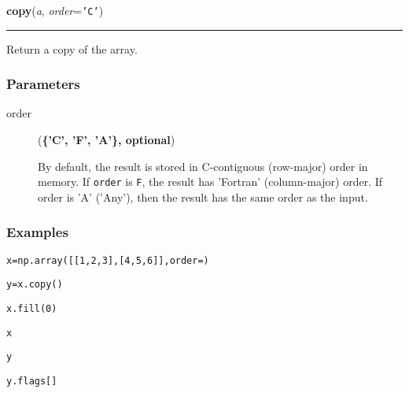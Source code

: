     \begin{boxedminipage}{\textwidth}

    \raggedright \textbf{copy}(\textit{a}, \textit{order}=\texttt{'C'})

    \vspace{-1.5ex}

    \rule{\textwidth}{0.5\fboxrule}

Return a copy of the array.



\hypertarget{parameters}{}
\subsubsection*{Parameters}
\begin{description}
\item[{order}] (\textbf{{\{}'C', 'F', 'A'{\}}, optional})

By default, the result is stored in C-contiguous (row-major) order in
memory.  If \texttt{order} is \texttt{F}, the result has 'Fortran' (column-major)
order.  If order is 'A' ('Any'), then the result has the same order
as the input.

\end{description}



\hypertarget{examples}{}
\subsubsection*{Examples}
\begin{alltt}
\pysrcprompt{{\textgreater}{\textgreater}{\textgreater} }x = np.array([[1,2,3],[4,5,6]], order=)\end{alltt}
\begin{alltt}
\pysrcprompt{{\textgreater}{\textgreater}{\textgreater} }y = x.copy()\end{alltt}
\begin{alltt}
\pysrcprompt{{\textgreater}{\textgreater}{\textgreater} }x.fill(0)\end{alltt}
\begin{alltt}
\pysrcprompt{{\textgreater}{\textgreater}{\textgreater} }x
\pysrcoutput{array([[0, 0, 0],}
\pysrcoutput{       [0, 0, 0]])}\end{alltt}
\begin{alltt}
\pysrcprompt{{\textgreater}{\textgreater}{\textgreater} }y
\pysrcoutput{array([[1, 2, 3],}
\pysrcoutput{       [4, 5, 6]])}\end{alltt}
\begin{alltt}
\pysrcprompt{{\textgreater}{\textgreater}{\textgreater} }y.flags[]
\end{alltt}
    \vspace{1ex}

    \end{boxedminipage}

